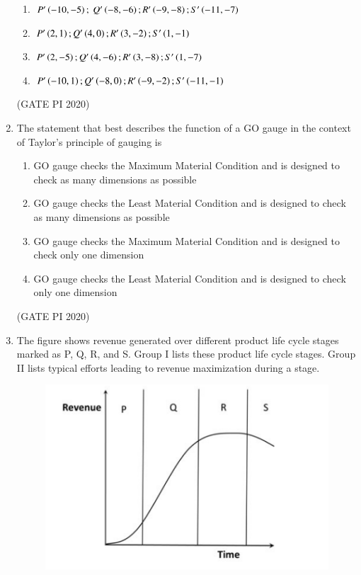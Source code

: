 \documentclass[journal,12pt,onecolumn]{IEEEtran}
\theoremstyle{remark}
\begin{document}
\begin{enumerate}
\begin{enumerate}
  \item $P'\left(-10,-5\right);\ Q'\left(-8,-6\right); R'\left(-9,-8\right); S'\left(-11,-7\right)$
    \item $P'\left(2,1\right); Q'\left(4,0\right); R'\left(3,-2\right); S'\left(1,-1\right)$
    \item $P'\left(2,-5\right); Q'\left(4,-6\right); R'\left(3,-8\right); S'\left(1,-7\right)$
    \item $P'\left(-10,1\right); Q'\left(-8,0\right); R'\left(-9,-2\right); S'\left(-11,-1\right)$
\end{enumerate}

\hfill (GATE PI 2020)

\item The statement that best describes the function of a GO gauge in the context of Taylor's principle of gauging is
\begin{enumerate}
    \item GO gauge checks the Maximum Material Condition and is designed to check as many dimensions as possible
    \item GO gauge checks the Least Material Condition and is designed to check as many dimensions as possible
    \item GO gauge checks the Maximum Material Condition and is designed to check only one dimension
    \item GO gauge checks the Least Material Condition and is designed to check only one dimension
\end{enumerate}

\hfill (GATE PI 2020)

\item The figure shows revenue generated over different product life cycle stages marked as P, Q, R, and S. Group I lists these product life cycle stages. Group II lists typical efforts leading to revenue maximization during a stage.

\begin{figure}[h]
    \centering
    \includegraphics[width=0.5\columnwidth]{figs/fig13.png}
    \caption{}
    \label{fig:placeholder}
\end{figure}


\end{enumerate}
\end{document}
